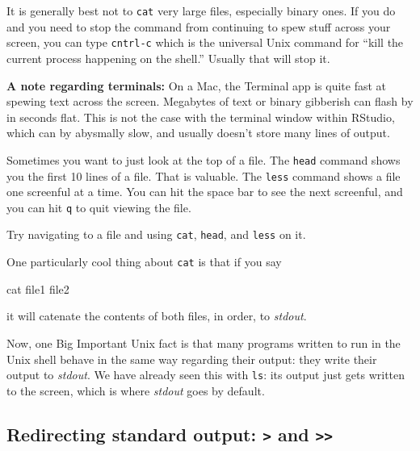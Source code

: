 \documentclass[]{krantz}
\makeatletter
\newenvironment{Shaded}{\begin{snugshade}}{\end{snugshade}}
\newcommand{\FunctionTok}[1]{\textcolor[rgb]{0,0,0}{#1}}
\newcommand{\NormalTok}[1]{#1}
\newenvironment{kframe}{%
\medskip{}
\setlength{\fboxsep}{.8em}
 \def\at@end@of@kframe{}%
 \ifinner\ifhmode%
  \def\at@end@of@kframe{\end{minipage}}%
  \begin{minipage}{\columnwidth}%
 \fi\fi%
 \def\FrameCommand##1{\hskip\@totalleftmargin \hskip-\fboxsep
 \colorbox{shadecolor}{##1}\hskip-\fboxsep
     \hskip-\linewidth \hskip-\@totalleftmargin \hskip\columnwidth}%
 \MakeFramed {\advance\hsize-\width
   \@totalleftmargin\z@ \linewidth\hsize
   \@setminipage}}%
 {\par\unskip\endMakeFramed%
 \at@end@of@kframe}
\renewenvironment{Shaded}{\begin{kframe}}{\end{kframe}}
\let\BeginKnitrBlock\begin \let\EndKnitrBlock\end
\makeatother
\begin{document}
It is generally best not to \texttt{cat} very large files, especially binary ones. If you do and
you need to stop the command from continuing to spew stuff across your screen, you can type
\texttt{cntrl-c} which is the universal Unix command for ``kill the current process happening on the
shell.'' Usually that will stop it.

\BeginKnitrBlock{rmdtip}
\textbf{A note regarding terminals:} On a Mac, the Terminal app is quite fast at spewing text
across the screen. Megabytes of text or binary gibberish can flash by in seconds flat. This
is not the case with the terminal window within RStudio, which can by abysmally slow, and usually
doesn't store many lines of output.
\EndKnitrBlock{rmdtip}

Sometimes you want to just look at the top of a file. The \texttt{head} command
shows you the first 10 lines of a file. That is valuable. The \texttt{less} command
shows a file one screenful at a time. You can hit the space bar to see the next screenful,
and you can hit \texttt{q} to quit viewing the file.

Try navigating to a file and using \texttt{cat}, \texttt{head}, and \texttt{less} on it.

One particularly cool thing about \texttt{cat} is that if you say

\begin{Shaded}
\begin{Highlighting}[]
\FunctionTok{cat}\NormalTok{ file1 file2}
\end{Highlighting}
\end{Shaded}

it will catenate the contents of both files, in order, to \emph{stdout}.

Now, one Big Important Unix fact is that many programs written to run in the
Unix shell behave in the same way regarding their output: they write their
output to \emph{stdout}. We have already seen this with \texttt{ls}: its output just
gets written to the screen, which is where \emph{stdout} goes by default.

\hypertarget{redirecting-standard-output-and}{%
\subsection{\texorpdfstring{Redirecting standard output: \texttt{\textgreater{}} and \texttt{\textgreater{}\textgreater{}}}{Redirecting standard output: \textgreater{} and \textgreater{}\textgreater{}}}\label{redirecting-standard-output-and}}
\end{document}
